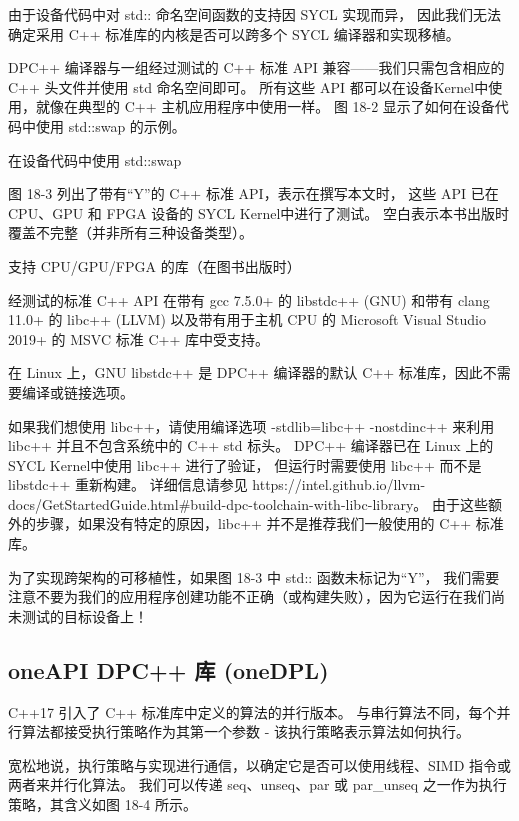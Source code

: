 \begin{remark}
	由于设备代码中对 std:: 命名空间函数的支持因 SYCL 实现而异，
	因此我们无法确定采用 C++ 标准库的内核是否可以跨多个 SYCL 编译器和实现移植。
\end{remark}

DPC++ 编译器与一组经过测试的 C++ 标准 API 兼容——我们只需包含相应的 C++ 头文件并使用 std 命名空间即可。 
所有这些 API 都可以在设备Kernel中使用，就像在典型的 C++ 主机应用程序中使用一样。 
图 18-2 显示了如何在设备代码中使用 std::swap 的示例。

{\color{red} 在设备代码中使用 std::swap}

图 18-3 列出了带有“Y”的 C++ 标准 API，表示在撰写本文时，
这些 API 已在 CPU、GPU 和 FPGA 设备的 SYCL Kernel中进行了测试。 
空白表示本书出版时覆盖不完整（并非所有三种设备类型）。

{\color{red} 支持 CPU/GPU/FPGA 的库（在图书出版时）}

经测试的标准 C++ API 在带有 gcc 7.5.0+ 的 libstdc++ (GNU) 
和带有 clang 11.0+ 的 libc++ (LLVM) 
以及带有用于主机 CPU 的 Microsoft Visual Studio 2019+ 的 MSVC 标准 C++ 库中受支持。

在 Linux 上，GNU libstdc++ 是 DPC++ 编译器的默认 C++ 标准库，因此不需要编译或链接选项。

如果我们想使用 libc++，请使用编译选项 -stdlib=libc++ -nostdinc++ 来利用 libc++ 
并且不包含系统中的 C++ std 标头。 
DPC++ 编译器已在 Linux 上的 SYCL Kernel中使用 libc++ 进行了验证，
但运行时需要使用 libc++ 而不是 libstdc++ 重新构建。 
详细信息请参见 https://intel.github.io/llvm-docs/GetStartedGuide.html\#build-dpc-toolchain-with-libc-library。 
由于这些额外的步骤，如果没有特定的原因，libc++ 并不是推荐我们一般使用的 C++ 标准库。

\begin{remark}
	为了实现跨架构的可移植性，如果图 18-3 中 std:: 函数未标记为“Y”，
	我们需要注意不要为我们的应用程序创建功能不正确（或构建失败），因为它运行在我们尚未测试的目标设备上！
\end{remark}

\subsection{oneAPI DPC++ 库 (oneDPL)}
C++17 引入了 C++ 标准库中定义的算法的并行版本。 
与串行算法不同，每个并行算法都接受执行策略作为其第一个参数 - 该执行策略表示算法如何执行。

宽松地说，执行策略与实现进行通信，以确定它是否可以使用线程、SIMD 指令或两者来并行化算法。 
我们可以传递 seq、unseq、par 或 par\_unseq 之一作为执行策略，其含义如图 18-4 所示。

